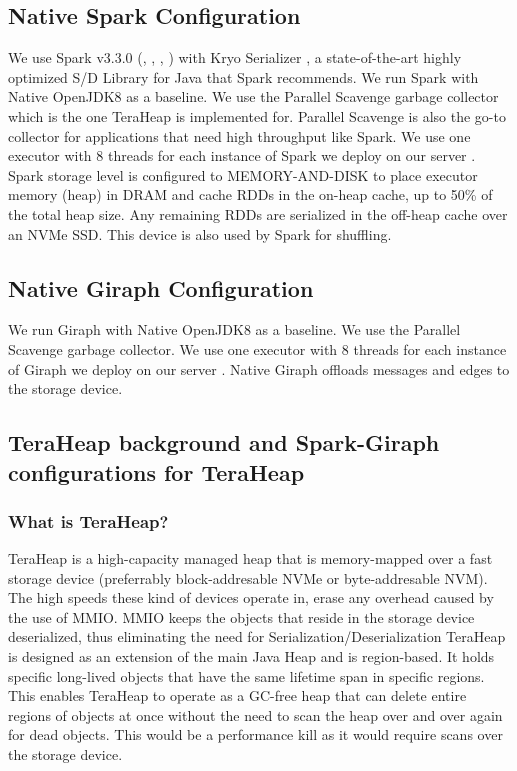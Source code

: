 \subsection{Native Spark Configuration}
We use Spark v3.3.0 (\cite{Building}, \cite{Tuning}, \cite{Conf}, \cite{Monitoring}) with Kryo Serializer \cite{Kryo}, a state-of-the-art highly optimized S/D Library for Java that Spark recommends. We run Spark
with Native OpenJDK8 \cite{JDK8} as a baseline. We use the Parallel Scavenge
garbage collector which is the one TeraHeap is implemented for.
Parallel Scavenge is also the go-to collector for applications that
need high throughput like Spark. We use one executor with 8
threads for each instance of Spark we deploy on our server \cite{TeraHeap}. Spark storage level
is configured to MEMORY-AND-DISK to place executor memory (heap) in DRAM and cache RDDs \cite{RDD}
in the on-heap cache, up to 50\% of the total heap size. Any remaining
RDDs are serialized in the off-heap cache over an NVMe SSD. This
device is also used by Spark for shuffling. 

\subsection{Native Giraph Configuration}
We run Giraph with Native OpenJDK8 \cite{JDK8} as a baseline. We use the Parallel Scavenge
garbage collector. We use one executor with 8 threads for each instance of Giraph we deploy on our server \cite{TeraHeap}. Native Giraph offloads messages and edges to the storage device.

\subsection{TeraHeap background and Spark-Giraph configurations for TeraHeap}
\subsubsection{What is TeraHeap?}
TeraHeap is a high-capacity managed heap that is memory-mapped over a
fast storage device (preferrably block-addresable NVMe or
byte-addresable NVM). The high speeds these kind of devices operate
in, erase any overhead caused by the use of MMIO. MMIO keeps the objects that reside in the storage
device deserialized, thus eliminating the need for Serialization/Deserialization  TeraHeap is designed
as an extension of the main Java Heap and is region-based. It holds specific long-lived
objects that have the same lifetime span in specific regions. This enables TeraHeap to
operate as a GC-free heap that can delete entire regions of objects at
once without the need to scan the heap over and over again for dead
objects. This would be a performance kill as it would require scans
over the storage device.


